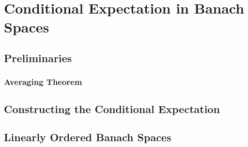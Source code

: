 ﻿%

\chapter{Conditional Expectation in Banach Spaces}\label{chapter:conditional_expectation}

\section{Preliminaries}
\subsection{Averaging Theorem}
\section{Constructing the Conditional Expectation}
\section{Linearly Ordered Banach Spaces}
